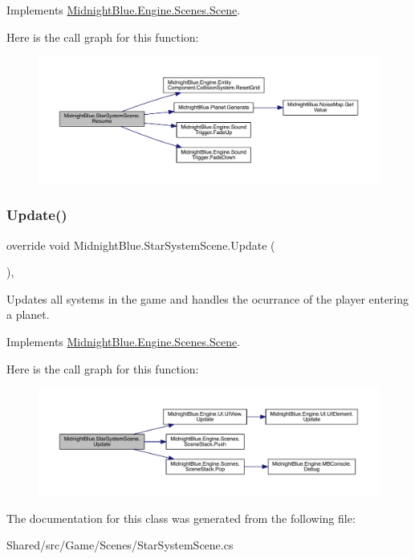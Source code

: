 Implements \hyperlink{class_midnight_blue_1_1_engine_1_1_scenes_1_1_scene_ab7cd837b20785116007a4732d90bc548}{Midnight\+Blue.\+Engine.\+Scenes.\+Scene}.

Here is the call graph for this function\+:
\nopagebreak
\begin{figure}[H]
\begin{center}
\leavevmode
\includegraphics[width=350pt]{class_midnight_blue_1_1_star_system_scene_aefbf0750a7ce153b923bcabb132e4875_cgraph}
\end{center}
\end{figure}
\hypertarget{class_midnight_blue_1_1_star_system_scene_ac36506b721064e015a9f93140681d93a}{}\label{class_midnight_blue_1_1_star_system_scene_ac36506b721064e015a9f93140681d93a} 
\subsubsection{\texorpdfstring{Update()}{Update()}}
{\footnotesize\ttfamily override void Midnight\+Blue.\+Star\+System\+Scene.\+Update (\begin{DoxyParamCaption}{ }\end{DoxyParamCaption})\hspace{0.3cm}{\ttfamily [inline]}, {\ttfamily [virtual]}}



Updates all systems in the game and handles the ocurrance of the player entering a planet. 



Implements \hyperlink{class_midnight_blue_1_1_engine_1_1_scenes_1_1_scene_a4e37ff3d5362a8ad5c0d82d7c990dfdf}{Midnight\+Blue.\+Engine.\+Scenes.\+Scene}.

Here is the call graph for this function\+:
\nopagebreak
\begin{figure}[H]
\begin{center}
\leavevmode
\includegraphics[width=350pt]{class_midnight_blue_1_1_star_system_scene_ac36506b721064e015a9f93140681d93a_cgraph}
\end{center}
\end{figure}


The documentation for this class was generated from the following file\+:\begin{DoxyCompactItemize}
\item 
Shared/src/\+Game/\+Scenes/Star\+System\+Scene.\+cs\end{DoxyCompactItemize}
